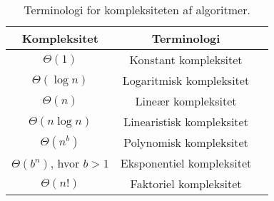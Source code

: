 \begin{table}[h]
 \begin{center}
  \begin{tabular}{|c|c|c|}
   \hline
   Kompleksitet & Terminologi\\
   \hline
   $\Theta(1)$ & Konstant kompleksitet\\
   $\Theta(\log n)$ & Logaritmisk kompleksitet\\
   $\Theta(n)$ & Lineær kompleksitet\\
   $\Theta(n \log n)$ & Linearistisk kompleksitet\\
   $\Theta(n^b)$ & Polynomisk kompleksitet\\
   $\Theta(b^n)$, hvor $b>1$ & Eksponentiel kompleksitet\\
   $\Theta(n!)$ & Faktoriel kompleksitet\\
   \hline
  \end{tabular}
 \end{center}
 \caption{Terminologi for kompleksiteten af algoritmer.}
 \label{tab_complex}
\end{table}
